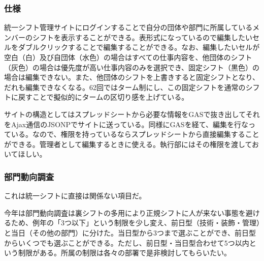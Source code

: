 \documentclass[dvipdfmx,jb5]{jarticle}
\begin{document}
 \subsubsection{仕様}
 統一シフト管理サイトにログインすることで自分の団体や部門に所属しているメンバーのシフトを表示することができる。表形式になっているので編集したいセルをダブルクリックすることで編集することができる。なお、編集したいセルが空白（白）及び自団体（水色）の場合はすべての仕事内容を、他団体のシフト（灰色）の場合は優先度が高い仕事内容のみを選択でき、固定シフト（黒色）の場合は編集できない。また、他団体のシフトを上書きすると固定シフトとなり、だれも編集できなくなる。62回ではターム制にし、この固定シフトを通常のシフトに戻すことで擬似的にタームの区切り感を上げている。

 サイトの構造としてはスプレッドシートから必要な情報をGASで抜き出してそれをAjax通信のJSONPでサイトに送っている。同様にGASを経て、編集を行なっている。なので、権限を持っているならスプレッドシートから直接編集することができる。管理者として編集するときに使える。執行部にはその権限を渡しておいてほしい。

 \subsubsection{部門動向調査}\label{sec:統一シフト-部門動向調査}
 これは統一シフトに直接は関係ない項目だ。

 今年は部門動向調査は裏シフトの多用により正規シフトに人が来ない事態を避けるため、例年の「3つ以下」という制限を少し変え、前日型（技術・装飾・管理）と当日（その他の部門）に分けた。当日型から3つまで選ぶことができ、前日型からいくつでも選ぶことができる。ただし、前日型・当日型合わせて5つ以内という制限がある。所属の制限は各々の部署で是非検討してもらいたい。
\end{document}
